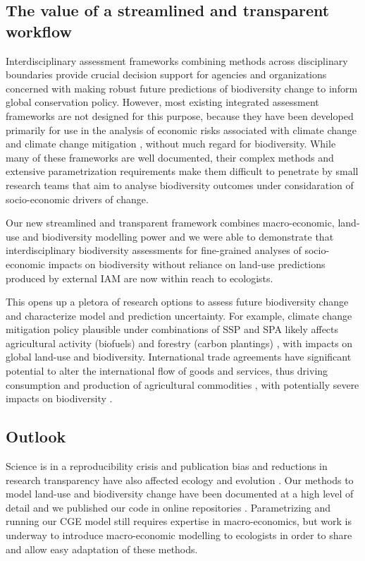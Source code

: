 \documentclass[titlesmallcaps,copyrightpage]{uomthesis}\usepackage[]{graphicx}\usepackage[]{color}
\begin{document}
\subsection{The value of a streamlined and transparent workflow}
Interdisciplinary assessment frameworks combining methods across disciplinary boundaries provide crucial decision support for agencies and organizations concerned with making robust future predictions of biodiversity change to inform global conservation policy. However, most existing integrated assessment frameworks are not designed for this purpose, because they have been developed primarily for use in the analysis of economic risks associated with climate change and climate change mitigation \citep[i.e.][]{hilaire_remind-magpie_2020}, without much regard for biodiversity. While many of these frameworks are well documented, their complex methods and extensive parametrization requirements make them difficult to penetrate by small research teams that aim to analyse biodiversity outcomes under considaration of socio-economic drivers of change. 

Our new streamlined and transparent framework combines macro-economic, land-use and biodiversity modelling power and we were able to demonstrate that interdisciplinary biodiversity assessments for fine-grained analyses of socio-economic impacts on biodiversity without reliance on land-use predictions produced by external IAM are now within reach to ecologists. 

This opens up a pletora of research options to assess future biodiversity change and characterize model and prediction uncertainty. For example, climate change mitigation policy plausible under combinations of SSP and SPA likely affects agricultural activity (biofuels) and forestry (carbon plantings) \citep{kriegler_new_2014, riahi_shared_2017}, with impacts on global land-use and biodiversity. International trade agreements have significant potential to alter the international flow of goods and services, thus driving consumption and production of agricultural commodities \citep{van_ha_building_2017}, with potentially severe impacts on biodiversity \citep{newbold_trouble_2019}.

\subsection{Outlook}
Science is in a reproducibility crisis \citep{open_science_collaboration_estimating_2015} and publication bias and reductions in research transparency have also affected ecology and evolution \citep{fidler_metaresearch_2017, fernandez-juricic_why_2021}. Our methods to model land-use and biodiversity change have been documented at a high level of detail and we published our code in online repositories \citep[][see also the code repository accompanying this thesis for all code written for this chapter]{kapitza_assessing_2021, kapitza_predictive_2020}. Parametrizing and running our CGE model still requires expertise in macro-economics, but work is underway to introduce macro-economic modelling to ecologists in order to share and allow easy adaptation of these methods. 
\end{document}
